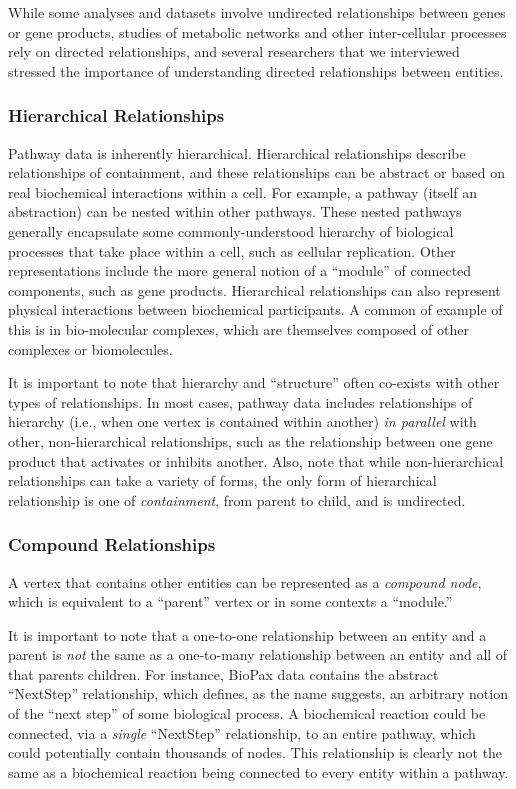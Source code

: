 \documentclass[journal]{vgtc}                %
\begin{document}
While some analyses and datasets involve undirected relationships between genes or gene products, studies of metabolic networks and other inter-cellular processes rely on directed relationships, and several researchers that we interviewed stressed the importance of understanding directed relationships between entities.

\subsubsection{Hierarchical Relationships}

Pathway data is inherently hierarchical.
Hierarchical relationships describe relationships of containment, and these relationships can be abstract or based on real biochemical interactions within a cell.
For example, a pathway (itself an abstraction) can be nested within other pathways.
These nested pathways generally encapsulate some commonly-understood hierarchy of biological processes that take place within a cell, such as cellular replication.
Other representations include the more general notion of a ``module'' of connected components, such as gene products.
Hierarchical relationships can also represent physical interactions between biochemical participants.
A common of example of this is in bio-molecular complexes, which are themselves composed of other complexes or biomolecules.

It is important to note that hierarchy and ``structure'' often co-exists with other types of relationships. In most cases, pathway data includes relationships of hierarchy (i.e., when one vertex is contained within another) \textit{in parallel} with other, non-hierarchical relationships, such as the relationship between one gene product that activates or inhibits another. Also, note that while non-hierarchical relationships can take a variety of forms, the only form of hierarchical relationship is one of \textit{containment}, from parent to child, and is undirected.

\subsubsection{Compound Relationships}

A vertex that contains other entities can be represented as a \textit{compound node}, which is equivalent to a ``parent'' vertex or in some contexts a ``module.''

It is important to note that a one-to-one relationship between an entity and a parent is \textit{not} the same as a one-to-many relationship between an entity and all of that parents children.
For instance, BioPax data contains the abstract ``NextStep'' relationship, which defines, as the name suggests, an arbitrary notion of the ``next step'' of some biological process.
A biochemical reaction could be connected, via a \textit{single} ``NextStep'' relationship, to an entire pathway, which could potentially contain thousands of nodes.
This relationship is clearly not the same as a biochemical reaction being connected to every entity within a pathway.
\end{document}
